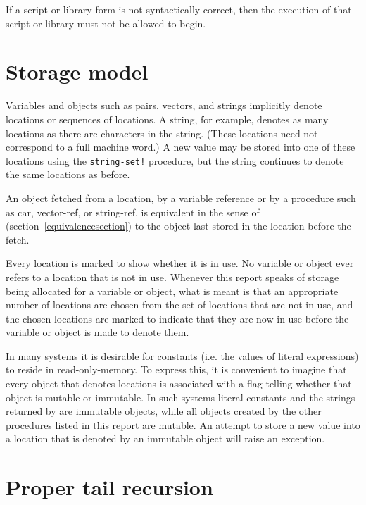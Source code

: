 If a script or library form is not syntactically correct, then the
execution of that script or library must not be allowed to begin.

\section{Storage model}
\label{storagemodel}

Variables and objects such as pairs, vectors, and strings implicitly
denote locations or sequences of locations.  A string, for
example, denotes as many locations as there are characters in the string. 
(These locations need not correspond to a full machine word.) A new value may be
stored into one of these locations using the {\tt string-set!} procedure, but
the string continues to denote the same locations as before.

An object fetched from a location, by a variable reference or by
a procedure such as {\cf car}, {\cf vector-ref}, or {\cf string-ref}, is
equivalent in the sense of  %
(section~\ref{equivalencesection})
to the object last stored in the location before the fetch.

Every location is marked to show whether it is in use.
No variable or object ever refers to a location that is not in use.
Whenever this report speaks of storage being allocated for a variable
or object, what is meant is that an appropriate number of locations are
chosen from the set of locations that are not in use, and the chosen
locations are marked to indicate that they are now in use before the variable
or object is made to denote them.

In many systems it is desirable for constants (i.e. the values of
literal expressions) to reside in read-only-memory.  To express this, it is
convenient to imagine that every object that denotes locations is associated
with a flag telling whether that object is mutable or
immutable.  In such systems literal constants and the strings
returned by  are immutable objects, while all objects
created by the other procedures listed in this report are mutable.  An
attempt to store a new value into a location that is denoted by an
immutable object will raise an exception.

\section{Proper tail recursion}
\label{proper tail recursion}

